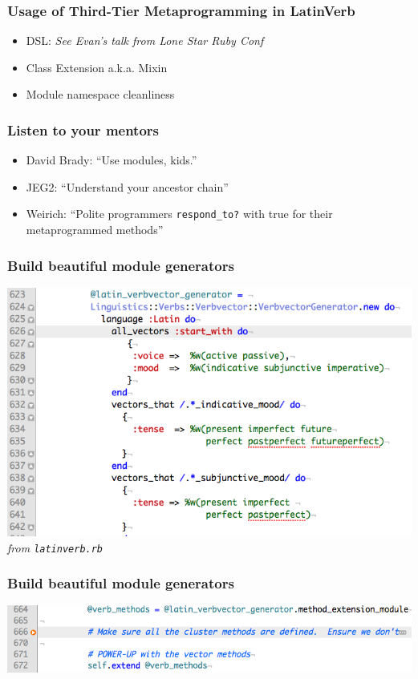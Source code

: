 \documentclass[slidestop,compress,mathserif]{beamer}
\begin{document}
\begin{frame}
	\frametitle{Usage of Third-Tier Metaprogramming in LatinVerb}
	\begin{itemize}
		\item DSL:  \emph{See Evan's talk from Lone Star Ruby Conf}
		\item Class Extension a.k.a. Mixin
		\item Module namespace cleanliness
	\end{itemize}
\end{frame}

\begin{frame}
	\frametitle{Listen to your mentors}
	\begin{itemize}
		\item David Brady:  ``Use modules, kids.''
		\item JEG2:  ``Understand your ancestor chain''
		\item Weirich:  ``Polite programmers \texttt{respond\_to?} with true for their metaprogrammed methods''
	\end{itemize}
\end{frame}

\begin{frame}
	\frametitle{Build beautiful module generators}
	\begin{center}
		\includegraphics[scale=0.35]{img/ll_dsl.png} \\
		\emph{from \texttt{latinverb.rb}}
	\end{center}	
\end{frame}

\begin{frame}
	\frametitle{Build beautiful module generators}
	\begin{center}
		\includegraphics[scale=0.35]{img/ll_mod_inc.png}
	\end{center}	
\end{frame}
\end{document}
